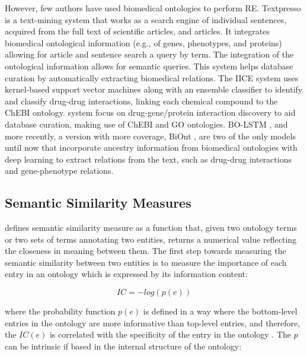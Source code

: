 However, few authors have used biomedical ontologies to perform RE. Textpresso \citep{muller2004textpresso} is a text-mining system that works as a search engine of individual sentences, acquired from the full text of scientific articles, and articles. It integrates biomedical ontological information (e.g., of genes, phenotypes, and proteins) allowing for article and sentence search a query by term. The integration of the ontological information allows for semantic queries. This system helps database curation by automatically extracting biomedical relations. The IICE \citep{lamurias2014identifying} system uses kernel-based support vector machines along with an ensemble classifier to identify and classify drug-drug interactions, linking each chemical compound to the ChEBI ontology. \cite{tripodi2017knowledge} system focus on drug-gene/protein interaction discovery to aid database curation, making use of ChEBI and GO ontologies. BO-LSTM \citep{lamurias2019bo}, and more recently, a version with more coverage, BiOnt \citep{sousa2020biont}, are two of the only models until now that incorporate ancestry information from biomedical ontologies with deep learning to extract relations from the text, such as drug-drug interactions and gene-phenotype relations. 



\subsection{Semantic Similarity Measures}

\cite{pesquita2009semantic} defines semantic similarity measure as a function that, given two ontology terms or two sets of terms annotating two entities, returns a numerical value reflecting the closeness in meaning between them. The first step towards measuring the semantic similarity between two entities is to measure the importance of each entry in an ontology which is expressed by its information content:

\begin{equation}
    IC = -log(p(e))
\end{equation}

where the probability function $p(e)$ is defined in a way where the bottom-level entries in the ontology are more informative than top-level entries, and therefore, the $IC(e)$ is correlated with the specificity of the entry in the ontology \citep{couto2019semantic}. The $p$ can be intrinsic if based in the internal structure of the ontology:

